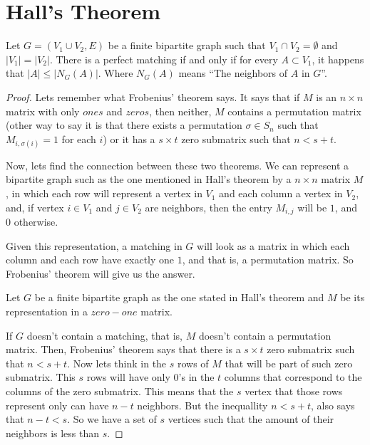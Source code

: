 ﻿\chapter{Hall's Theorem}

    \begin{theorem}
        Let $G = (V_1 \cup V_2, E)$ be a finite bipartite graph such that $V_1 \cap V_2 = \emptyset$ and $\left|V_1\right| = \left|V_2\right|$.
        There is a perfect matching if and only if for every $A \subset V_1$, it happens that $\left|A\right| \leq \left|N_G(A)\right|$. Where
        $N_G(A)$ means ``The neighbors of $A$ in $G$''.
    \end{theorem}
    
    \begin{proof}
        Lets remember what Frobenius' theorem says. It says that if $M$ is an $n \times n$ matrix with only $ones$ and $zeros$, then neither,
        $M$ contains a permutation matrix (other way to say it is that there exists a permutation $\sigma \in S_n$ such that $M_{i, \sigma(i)} = 1$ 
        for each $i$) or it has a $s \times t$ zero submatrix such that $n < s + t$.\pn
        
        Now, lets find the connection between these two theorems. We can represent a bipartite graph such as the one mentioned in Hall's theorem by 
        a $n \times n$ matrix $M$, in which each row will represent a vertex in $V_1$ and each column a vertex in $V_2$, and, if vertex $i \in V_1$ and 
        $j \in V_2$ are neighbors, then the entry $M_{i,j}$ will be $1$, and $0$ otherwise.\pn
        
        Given this representation, a matching in $G$ will look as a matrix in which each column and each row have exactly one $1$, and that is,
        a permutation matrix. So Frobenius' theorem will give us the answer.\pn
        
        Let $G$ be a finite bipartite graph as the one stated in Hall's theorem and $M$ be its representation in a $zero-one$ matrix.\pn
        
        If $G$ doesn't contain a matching, that is, $M$ doesn't contain a permutation matrix. Then, Frobenius' theorem says that there is 
        a $s \times t$ zero submatrix such that $n < s + t$. Now lets think in the $s$ rows of $M$ that will be part of such zero submatrix.
        This $s$ rows will have only $0$'s in the $t$ columns that correspond to the columns of the zero submatrix. This means that the $s$ vertex that
        those rows represent only can have $n - t$ neighbors. But the inequallity $n < s + t$, also says that $n - t < s$. So we have a
        set of $s$ vertices such that the amount of their neighbors is less than $s$.\pn
        

\end{proof}
